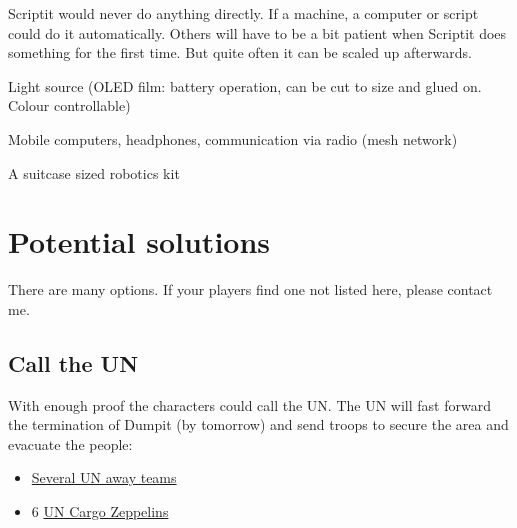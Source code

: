 \begin{npcBox}[title=Scriptit - a Pioneer Automationationeer]
    \begin{stressSection}
    \end{stressSection}
    \begin{tabularx}{\textwidth}{ XX }
    \end{tabularx}

    \begin{consequences}
    \item {}
    \item {}
    \item {}
    \end{consequences}

    \begin{npcDescription}
    Scriptit would never do anything directly. If a machine, a computer or script could do it automatically. Others will have to be a bit patient when Scriptit does something for the first time. But quite often it can be scaled up afterwards.

    \end{npcDescription}

    \begin{equipment}
        \item Light source (OLED film: battery operation, can be cut to size and glued on. Colour controllable)
        \item Mobile computers, headphones, communication via radio (mesh network)
        \item A suitcase sized robotics kit
    \end{equipment}
\end{npcBox}

\section{Potential solutions}

There are many options. If your players find one not listed here, please contact me.

\subsection{Call the UN}

With enough proof the characters could call the UN. The UN will fast forward the termination of Dumpit (by tomorrow) and send troops to secure the area and evacuate the people:

\begin{itemize}
    \item \hyperref[sec: UN away team]{Several UN away teams}
    \item 6 \hyperref[sec: UN Cargo Zeppelins]{UN Cargo Zeppelins}
\end{itemize}

